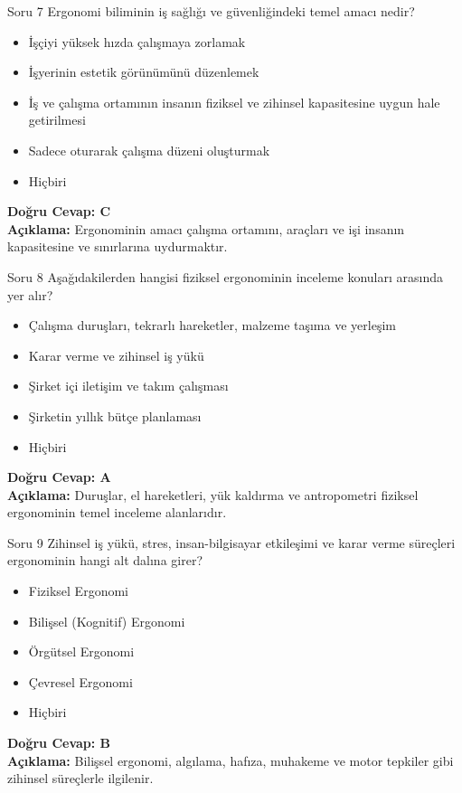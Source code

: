\documentclass[12pt,a4paper]{article}
\begin{document}
\begin{testcard}{Soru 7}
    Ergonomi biliminin iş sağlığı ve güvenliğindeki temel amacı nedir?
    \begin{itemize}
        \item[A)] İşçiyi yüksek hızda çalışmaya zorlamak
        \item[B)] İşyerinin estetik görünümünü düzenlemek
        \item[C)] İş ve çalışma ortamının insanın fiziksel ve zihinsel kapasitesine uygun hale getirilmesi
        \item[D)] Sadece oturarak çalışma düzeni oluşturmak
        \item[E)] Hiçbiri
    \end{itemize}
    \tcblower
    \textbf{Doğru Cevap: C} \\
    \textbf{Açıklama:} Ergonominin amacı çalışma ortamını, araçları ve işi insanın kapasitesine ve sınırlarına uydurmaktır.
\end{testcard}

\begin{testcard}{Soru 8}
    Aşağıdakilerden hangisi fiziksel ergonominin inceleme konuları arasında yer alır?
    \begin{itemize}
        \item[A)] Çalışma duruşları, tekrarlı hareketler, malzeme taşıma ve yerleşim
        \item[B)] Karar verme ve zihinsel iş yükü
        \item[C)] Şirket içi iletişim ve takım çalışması
        \item[D)] Şirketin yıllık bütçe planlaması
        \item[E)] Hiçbiri
    \end{itemize}
    \tcblower
    \textbf{Doğru Cevap: A} \\
    \textbf{Açıklama:} Duruşlar, el hareketleri, yük kaldırma ve antropometri fiziksel ergonominin temel inceleme alanlarıdır.
\end{testcard}

\begin{testcard}{Soru 9}
    Zihinsel iş yükü, stres, insan-bilgisayar etkileşimi ve karar verme süreçleri ergonominin hangi alt dalına girer?
    \begin{itemize}
        \item[A)] Fiziksel Ergonomi
        \item[B)] Bilişsel (Kognitif) Ergonomi
        \item[C)] Örgütsel Ergonomi
        \item[D)] Çevresel Ergonomi
        \item[E)] Hiçbiri
    \end{itemize}
    \tcblower
    \textbf{Doğru Cevap: B} \\
    \textbf{Açıklama:} Bilişsel ergonomi, algılama, hafıza, muhakeme ve motor tepkiler gibi zihinsel süreçlerle ilgilenir.
\end{testcard}
\end{document}

